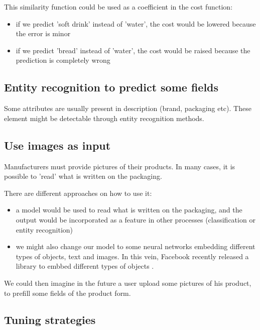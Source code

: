 This similarity function could be used as a coefficient in the cost function: 
\begin{itemize}
	\item if we predict 'soft drink' instead of 'water', the cost would be lowered because the error is minor
	\item if we predict 'bread' instead of 'water', the cost would be raised because the prediction is completely wrong
\end{itemize}

\subsection{Entity recognition to predict some fields}
Some attributes are usually present in description (brand, packaging etc). These element might be detectable through entity recognition methods.

\subsection{Use images as input}

Manufacturers must provide pictures of their products. In many cases, it is possible to 'read' what is written on the packaging.

There are different approaches on how to use it:
\begin{itemize}
	\item a model would be used to read what is written on the packaging, and the output would be incorporated as a feature in other processes (classification or entity recognition)
	\item we might also change our model to some neural networks embedding different types of objects, text and images. In this vein, Facebook recently released a library to embbed different types of objects \cite[starspace]{wu2017starspace}.
\end{itemize}

We could then imagine in the future a user upload some pictures of his product, to prefill some fields of the product form.

\subsection{Tuning strategies}


